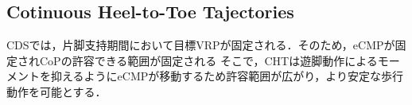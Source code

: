 \documentclass[twocolumn]{jsarticle}
\begin{document}
\subsection{Cotinuous Heel-to-Toe Tajectories}
CDSでは，片脚支持期間において目標VRPが固定される．そのため，eCMPが固定されCoPの許容できる範囲が固定される%
そこで，CHTは遊脚動作によるモーメントを抑えるようにeCMPが移動するため許容範囲が広がり，より安定な歩行動作を可能とする．%
\end{document}
